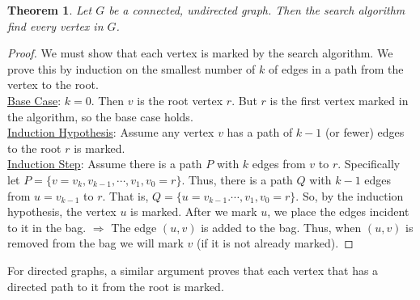 \documentclass[11pt, a4paper, oneside]{book}
\theoremstyle{theoremdd}
\newtheorem{theorem}{Theorem}[chapter]
\theoremstyle{remark}
\begin{document}
\begin{theorem}
Let $G$ be a connected, undirected graph. Then the search algorithm find every vertex in $G$. 
\end{theorem}
\begin{proof}
We must show that each vertex is marked by the search algorithm. We prove this by induction on the smallest number of $k$ of edges in a path from the vertex to the root. \\
\underline{Base Case}: $k=0$. Then $v$ is the root vertex $r$. But $r$ is the first vertex marked in the algorithm, so the base case holds. \\
\underline{Induction Hypothesis}: Assume any vertex $v$ has a path of $k-1$ (or fewer) edges to the root $r$ is marked. \\
\underline{Induction Step}: Assume there is a path $P$ with $k$ edges from $v$ to $r$. Specifically let $P=\{v=v_{k},v_{k-1},\cdots,v_{1},v_{0}=r\}$. Thus, there is a path $Q$ with $k-1$ edges from $u=v_{k-1}$ to $r$. That is, $Q=\{u=v_{k-1}.\cdots, v_{1},v_{0}=r\}$. So, by the induction hypothesis, the vertex $u$ is marked. After we mark $u$, we place the edges incident to it in the bag. $\Rightarrow$ The edge $(u,v)$ is added to the bag. Thus, when $(u,v)$ is removed from the bag we will mark $v$ (if it is not already marked). 
\end{proof}
For directed graphs, a similar argument proves that each vertex that has a directed path to it from the root is marked. 
\end{document}
